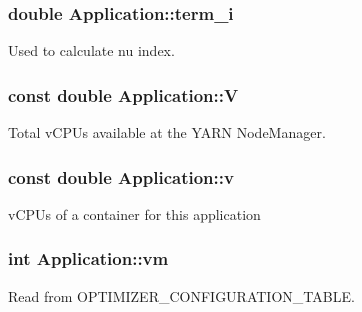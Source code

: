 \hypertarget{classApplication_ad5486702327ad61e56ed04fb54d58c20}{
\subsubsection[{term\-\_\-i}]{\setlength{\rightskip}{0pt plus 5cm}double Application\-::term\-\_\-i\hspace{0.3cm}{\ttfamily [private]}}}\label{classApplication_ad5486702327ad61e56ed04fb54d58c20}


Used to calculate nu index. 

\hypertarget{classApplication_a03a99fa3553c376653e53bb5f489c316}{
\subsubsection[{V}]{\setlength{\rightskip}{0pt plus 5cm}const double Application\-::\-V\hspace{0.3cm}{\ttfamily [private]}}}\label{classApplication_a03a99fa3553c376653e53bb5f489c316}


Total v\-C\-P\-Us available at the Y\-A\-R\-N Node\-Manager. 

\hypertarget{classApplication_a57853498c230af817bc4173169847bfc}{
\subsubsection[{v}]{\setlength{\rightskip}{0pt plus 5cm}const double Application\-::v\hspace{0.3cm}{\ttfamily [private]}}}\label{classApplication_a57853498c230af817bc4173169847bfc}


v\-C\-P\-Us of a container for this application 

\hypertarget{classApplication_a0a3fe386eb8244e536bc5297709d1269}{
\subsubsection[{vm}]{\setlength{\rightskip}{0pt plus 5cm}int Application\-::vm\hspace{0.3cm}{\ttfamily [private]}}}\label{classApplication_a0a3fe386eb8244e536bc5297709d1269}


Read from O\-P\-T\-I\-M\-I\-Z\-E\-R\-\_\-\-C\-O\-N\-F\-I\-G\-U\-R\-A\-T\-I\-O\-N\-\_\-\-T\-A\-B\-L\-E. 

